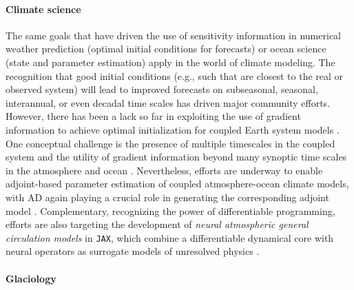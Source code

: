 \paragraph{Climate science}

The same goals that have driven the use of sensitivity information in numerical weather prediction (optimal initial conditions for forecasts) or ocean science (state and parameter estimation) apply in the world of climate modeling.
The recognition that good initial conditions (e.g., such that are closest to the real or observed system) will lead to improved forecasts on subseasonal, seasonal, interannual, or even decadal time scales has driven major community efforts\cite{Meehl.2021}. However, there has been a lack so far in exploiting the use of gradient information to achieve optimal initialization for coupled Earth system models \cite{Frolov.2023}. 
One conceptual challenge is the presence of multiple timescales in the coupled system and the utility of gradient information beyond many synoptic time scales in the atmosphere and ocean \cite{Lea:2000gv,Lea:2002cv}.
Nevertheless, efforts are underway to enable adjoint-based parameter estimation of coupled atmosphere-ocean climate models, with AD again playing a crucial role in generating the corresponding adjoint model
\cite{Blessing.2014,Lyu.2018,Stammer:2018de}.
Complementary, recognizing the power of differentiable programming, efforts are also targeting the development of \textit{neural atmospheric general circulation models} in \texttt{JAX}, which combine a differentiable dynamical core with neural operators as surrogate models of unresolved physics
\cite{Kochkov.2023}.

\paragraph{Glaciology}

